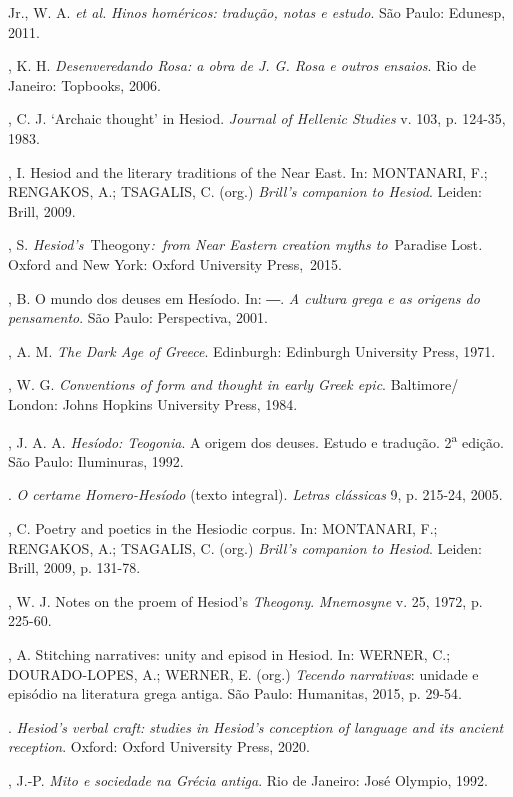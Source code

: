 \begin{bibliohedra}
 Jr., W. A. \emph{et al.} \emph{Hinos homéricos: tradução, notas
e estudo}. São Paulo: Edunesp, 2011.

, K. H. \emph{Desenveredando Rosa: a obra de J. G. Rosa e
outros ensaios}. Rio de Janeiro: Topbooks, 2006.

, C. J. `Archaic thought' in Hesiod. \emph{Journal of Hellenic
Studies} v. 103, p. 124-35, 1983.

, I. Hesiod and the literary traditions of the Near East. In:
MONTANARI, F.; RENGAKOS, A.; TSAGALIS, C. (org.) \emph{Brill's companion
to Hesiod}. Leiden: Brill, 2009.

, S. \emph{Hesiod's~}Theogony\emph{:~from Near Eastern
creation myths to}~Paradise Lost\emph{.} Oxford and New York: Oxford
University Press,~2015.

, B. O mundo dos deuses em Hesíodo. In: ―. \emph{A cultura grega e
as origens do pensamento}. São Paulo: Perspectiva, 2001.

, A. M. \emph{The Dark Age of Greece}. Edinburgh: Edinburgh
University Press, 1971.

, W. G. \emph{Conventions of form and thought in early Greek
epic}. Baltimore/ London: Johns Hopkins University Press, 1984.

, J. A. A. \emph{Hesíodo: Teogonia}. A origem dos deuses. Estudo
e tradução. 2\textsuperscript{a} edição. São Paulo: Iluminuras, 1992.

\titidem. \emph{O certame Homero-Hesíodo} (texto integral). \emph{Letras
clássicas} 9, p. 215-24, 2005.

, C. Poetry and poetics in the Hesiodic corpus. In: MONTANARI,
F.; RENGAKOS, A.; TSAGALIS, C. (org.) \emph{Brill's companion to
Hesiod}. Leiden: Brill, 2009, p. 131-78.

, W. J. Notes on the proem of Hesiod's \emph{Theogony}.
\emph{Mnemosyne} v. 25, 1972, p. 225-60.

, A. Stitching narratives: unity and episod in Hesiod. In:
WERNER, C.; DOURADO-LOPES, A.; WERNER, E. (org.) \emph{Tecendo
narrativas}: unidade e episódio na literatura grega antiga. São Paulo:
Humanitas, 2015, p. 29-54.

\titidem. \emph{Hesiod's verbal craft: studies in Hesiod's conception of
language and its ancient reception}. Oxford: Oxford University Press,
2020.

, J.-P. \emph{Mito e sociedade na Grécia antiga}. Rio de Janeiro:
José Olympio, 1992.


\end{bibliohedra}
